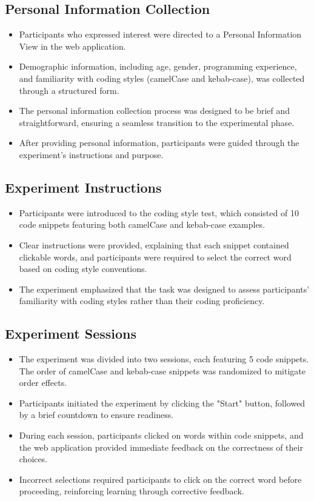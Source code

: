 \documentclass{article}
\begin{document}
\subsection*{Personal Information Collection}

\begin{itemize}
  \item Participants who expressed interest were directed to a Personal Information View in the web application.
  \item Demographic information, including age, gender, programming experience, and familiarity with coding styles (camelCase and kebab-case), was collected through a structured form.
  \item The personal information collection process was designed to be brief and straightforward, ensuring a seamless transition to the experimental phase.
  \item After providing personal information, participants were guided through the experiment's instructions and purpose.
\end{itemize}

\subsection*{Experiment Instructions}

\begin{itemize}
  \item Participants were introduced to the coding style test, which consisted of 10 code snippets featuring both camelCase and kebab-case examples.
  \item Clear instructions were provided, explaining that each snippet contained clickable words, and participants were required to select the correct word based on coding style conventions.
  \item The experiment emphasized that the task was designed to assess participants' familiarity with coding styles rather than their coding proficiency.
\end{itemize}

\subsection*{Experiment Sessions}

\begin{itemize}
  \item The experiment was divided into two sessions, each featuring 5 code snippets. The order of camelCase and kebab-case snippets was randomized to mitigate order effects.
  \item Participants initiated the experiment by clicking the "Start" button, followed by a brief countdown to ensure readiness.
  \item During each session, participants clicked on words within code snippets, and the web application provided immediate feedback on the correctness of their choices.
  \item Incorrect selections required participants to click on the correct word before proceeding, reinforcing learning through corrective feedback.
\end{itemize}
\end{document}
